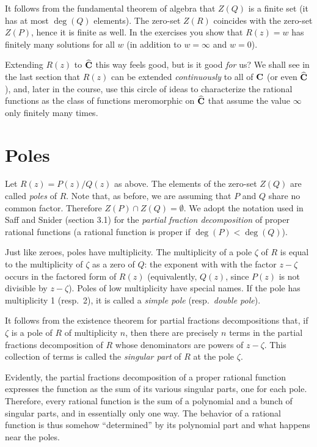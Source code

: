 \documentclass[twocolumn,12pt]{article}
\begin{document}
It follows from the fundamental theorem of algebra that $Z(Q)$ is a finite set (it has at most $\deg{(Q)}$ elements). The zero-set $Z(R)$ coincides with the zero-set $Z(P)$, hence it is finite as well. In the exercises you show that $R(z) = w$ has finitely many solutions for all $w$ (in addition to $w = \infty$ and $w = 0$).

Extending $R(z)$ to $\widehat{\mathbf{C}}$ this way feels good, but is it good \emph{for} us? We shall see in the last section that $R(z)$ can be extended \emph{continuously} to all of $\mathbf{C}$ (or even $\widehat{\mathbf{C}}$), and, later in the course, use this circle of ideas to characterize the rational functions as the class of functions meromorphic on $\widehat{\mathbf{C}}$ that assume the value $\infty$ only finitely many times.

\section{Poles}
Let $R(z) = P(z)/Q(z)$ as above. The elements of the zero-set $Z(Q)$ are called \emph{poles} of $R$. Note that, as before, we are assuming that $P$ and $Q$ share no common factor. Therefore $Z(P) \cap Z(Q) = \emptyset$. We adopt the notation used in Saff and Snider (section 3.1) for the \emph{partial fraction decomposition} of proper rational functions (a rational function is proper if $\deg{(P)} < \deg{(Q)}$). 

Just like zeroes, poles have multiplicity. The multiplicity of a pole $\zeta$ of $R$ is equal to the multiplicity of $\zeta$ as a zero of $Q$: the exponent with with the factor $z - \zeta$ occurs in the factored form of $R(z)$ (equivalently, $Q(z)$, since $P(z)$ is not divisible by $z - \zeta$). Poles of low multiplicity have special names. If the pole has multiplicity 1 (resp.\ 2), it is called a \emph{simple pole} (resp.\ \emph{double pole}).

It follows from the existence theorem for partial fractions decompositions that, if $\zeta$ is a pole of $R$ of multiplicity $n$, then there are precisely $n$ terms in the partial fractions decomposition of $R$ whose denominators are powers of $z - \zeta$. This collection of terms is called the \emph{singular part} of $R$ at the pole $\zeta$. 

Evidently, the partial fractions decomposition of a proper rational function expresses the function as the sum of its various singular parts, one for each pole. Therefore, every rational function is the sum of a polynomial and a bunch of singular parts, and in essentially only one way. The behavior of a rational function is thus somehow ``determined'' by its polynomial part and what happens near the poles.
\end{document}
